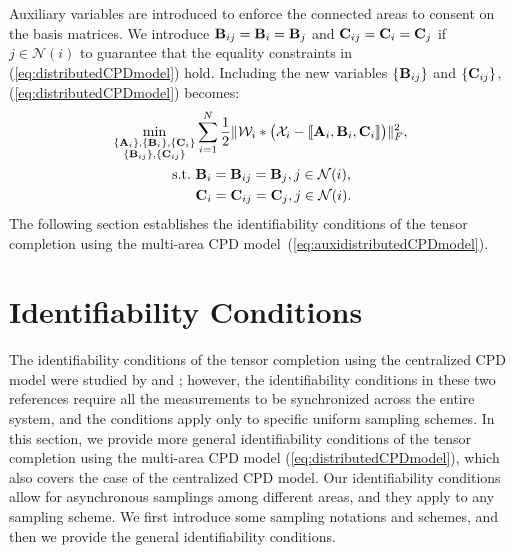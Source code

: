 \documentclass[journal]{IEEEtran}
\newcommand{\cpd}[3]{\llbracket #1, #2, #3 \rrbracket}
\newcommand{\A}{{\bf A}}
\newcommand{\B}{{\bf B}}
\newcommand{\C}{{\bf C}}
\newcommand{\Ten}[1]{\mathcal{#1}}
\begin{document}
Auxiliary variables are introduced to enforce the connected areas to consent on the basis matrices. We introduce $\B_{ij}= \B_i = \B_j$ and 
$\C_{ij}= \C_i = \C_j$ if $j\in\mathcal{N}(i)$ to guarantee that the equality constraints in (\ref{eq:distributedCPDmodel}) hold. Including the new variables $\{\B_{ij}\}$ and $\{\C_{ij}\}$, (\ref{eq:distributedCPDmodel}) becomes:
\begin{equation}
   \label{eq:auxidistributedCPDmodel}
    \begin{aligned}
    \min_{\substack{\{\A_i\}, \{\B_i\}, \{\C_i\}\\ \{\B_{ij}\}, \{\C_{ij}\}}} &\sum_{i=1}^N\frac{1}{2}\| \Ten{W}_i * \big(\Ten{X}_i - {\cpd{\A_i}{\B_i}{\C_i}} \big)\|_F^2,\\
     \ \text{s.t.}\ &\B_i = \B_{ij}=\B_{j}, j\in\mathcal{N}(i),\\
     &  \C_i = \C_{ij}=\C_{j}, j\in\mathcal{N}(i).
    \end{aligned}
\end{equation}
The following section establishes the identifiability conditions of the tensor completion using the multi-area CPD model~(\ref{eq:auxidistributedCPDmodel}).

\section{Identifiability Conditions}
\label{sec:identifiabilityconditions}
The identifiability conditions of the  tensor
completion using the centralized CPD model were studied by  \cite{Zamzam2020} and \cite{Kanatsoulis2020}; however, the  identifiability conditions in these two references require  all the measurements to be synchronized across the entire system, and the conditions 
 apply only to specific uniform sampling schemes. 
In this section, we provide more general identifiability conditions  of the tensor completion using the multi-area CPD model (\ref{eq:distributedCPDmodel}), which also covers the case of the centralized CPD model. Our identifiability conditions  allow for asynchronous samplings among different areas, and they apply to any sampling scheme.
We first introduce some sampling notations and schemes, and then we provide the general identifiability conditions.
\end{document}
